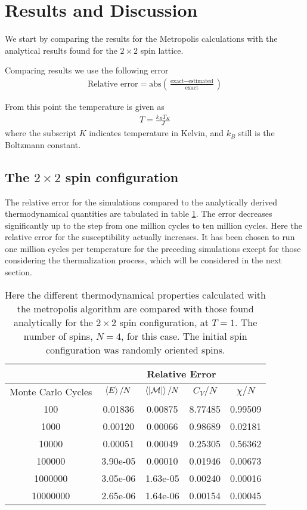 \documentclass[11pt, a4paper]{article}
\begin{document}
\section{Results and Discussion}
We start by comparing the results for the Metropolis calculations with the analytical results found for the $2\times 2$ spin lattice.

Comparing results we use the following error
\begin{gather}
\text{Relative error} = \text{abs}\left(\frac{\text{exact}-\text{estimated}}{\text{exact}}\right)
\end{gather}

From this point the temperature is given as
\begin{gather}
T = \frac{k_BT_K}{J}
\end{gather}
where the subscript $K$ indicates temperature in Kelvin, and $k_B$ still is the Boltzmann constant.

\subsection{The $2\times 2$ spin configuration}
The relative error for the simulations compared to the analytically derived thermodynamical quantities are tabulated in table \ref{tab:relerr2x2}. The error decreases significantly up to the step from one million cycles to ten million cycles. Here the relative error for the susceptibility actually increases. It has been chosen to run one million cycles per temperature for the preceding simulations except for those considering the thermalization process, which will be considered in the next section.
\begin{table}[!ht]
\centering
\begin{tabular}{c|c|c|c|c}
& \multicolumn{4}{c}{Relative Error}\\
\hline
Monte Carlo Cycles & $\braket{E}/N$ & $\braket{|\cal M|}/N$ & $C_V/N$ & $\chi /N$\\
\hline
100 & 0.01836 & 0.00875& 8.77485& 0.99509\\
1000 & 0.00120 & 0.00066& 0.98689& 0.02181\\
10000 & 0.00051 & 0.00049& 0.25305& 0.56362\\
100000 & 3.90e-05& 0.00010& 0.01946& 0.00673\\
1000000 & 3.05e-06 &1.63e-05 & 0.00240 & 0.00016\\
10000000 & 2.65e-06&1.64e-06& 0.00154 & 0.00045
\end{tabular}
\caption{Here the different thermodynamical properties calculated with the metropolis algorithm are compared with those found analytically for the $2\times 2$ spin configuration, at $T=1$. The number of spins, $N=4$, for this case. The initial spin configuration was randomly oriented spins.}
\label{tab:relerr2x2}
\end{table}
\end{document}
